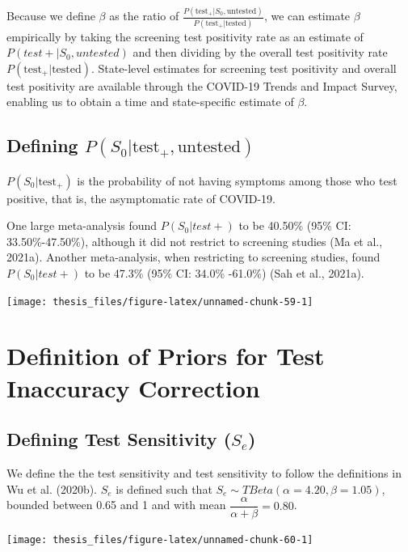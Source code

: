 \documentclass[12pt,twoside]{smiththesis}
\begin{document}
Because we define \(\beta\) as the ratio of \(\frac{P(\text{test}_+ |S_0, \text{untested})}{P(\text{test}_+|\text{tested})}\), we can estimate \(\beta\) empirically by taking the screening test positivity rate as an estimate of \(P(test + |S_0, untested)\) and then dividing by the overall test positivity rate \(P(\text{test}_+|\text{tested})\). State-level estimates for screening test positivity and overall test positivity are available through the COVID-19 Trends and Impact Survey, enabling us to obtain a time and state-specific estimate of \(\beta\).

\hypertarget{defining-ps_0texttest_textuntested}{%
\subsection{\texorpdfstring{Defining \(P(S_0|\text{test}_+,\text{untested})\)}{Defining P(S\_0\textbar\textbackslash text\{test\}\_+,\textbackslash text\{untested\})}}\label{defining-ps_0texttest_textuntested}}

\(P(S_0|\text{test}_+)\) is the probability of not having symptoms among those who test positive, that is, the asymptomatic rate of COVID-19.

One large meta-analysis found \(P(S_0|test+)\) to be 40.50\% (95\% CI: 33.50\%-47.50\%), although it did not restrict to screening studies (Ma et al., 2021a). Another meta-analysis, when restricting to screening studies, found \(P(S_0|test+)\) to be 47.3\% (95\% CI: 34.0\% -61.0\%) (Sah et al., 2021a).
\begin{center}\texttt{[image: thesis\_files/figure-latex/unnamed-chunk-59-1]} \end{center}

\hypertarget{definition-of-priors-for-test-inaccuracy-correction}{%
\section{Definition of Priors for Test Inaccuracy Correction}\label{definition-of-priors-for-test-inaccuracy-correction}}

\hypertarget{defining-test-sensitivity-s_e}{%
\subsection{\texorpdfstring{Defining Test Sensitivity (\(S_e\))}{Defining Test Sensitivity (S\_e)}}\label{defining-test-sensitivity-s_e}}

We define the the test sensitivity and test sensitivity to follow the definitions in Wu et al. (2020b).
\(S_e\) is defined such that \(S_e \sim TBeta(\alpha = 4.20, \beta = 1.05)\), bounded between 0.65 and 1 and with mean \(\dfrac{\alpha}{\alpha + \beta} = 0.80\).
\begin{center}\texttt{[image: thesis\_files/figure-latex/unnamed-chunk-60-1]} \end{center}
\end{document}
